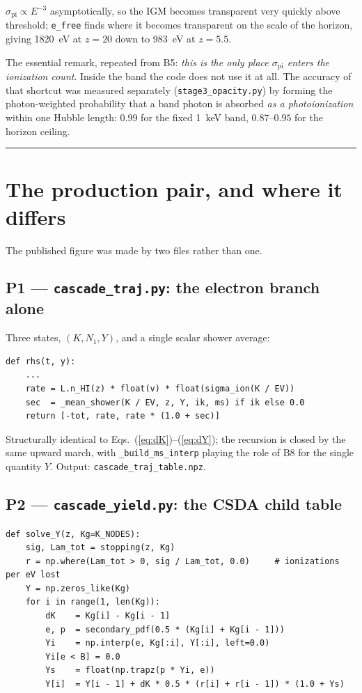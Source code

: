 \documentclass[11pt,a4paper]{article}
\newcommand{\code}[1]{\texttt{\small #1}}
\newcommand{\file}[1]{\texttt{\small #1}}
\newcommand{\spi}{\sigma_{\mathrm{pi}}}
\begin{document}
$\spi \propto E^{-3}$ asymptotically, so the IGM becomes transparent very
quickly above threshold; \code{e\_free} finds where it becomes transparent on
the scale of the horizon, giving 1820~eV at $z=20$ down to 983~eV at $z=5.5$.

The essential remark, repeated from B5: \emph{this is the only place $\spi$
enters the ionization count}.  Inside the band the code does not use it at all.
The accuracy of that shortcut was measured separately (\file{stage3\_opacity.py})
by forming the photon-weighted probability that a band photon is absorbed
\emph{as a photoionization} within one Hubble length:
$0.99$ for the fixed 1~keV band, $0.87$--$0.95$ for the horizon ceiling.

\bigskip
\hrule

\section{The production pair, and where it differs}
\label{sec:prod}

The published figure was made by two files rather than one.

\subsection*{P1 --- \file{cascade\_traj.py}: the electron branch alone}

Three states, $(K, N_1, Y)$, and a single scalar shower average:

\begin{lstlisting}
def rhs(t, y):
    ...
    rate = L.n_HI(z) * float(v) * float(sigma_ion(K / EV))
    sec  = _mean_shower(K / EV, z, Y, ik, ms) if ik else 0.0
    return [-tot, rate, rate * (1.0 + sec)]
\end{lstlisting}

Structurally identical to Eqs.~(\ref{eq:dK})--(\ref{eq:dY}); the recursion is
closed by the same upward march, with \code{\_build\_ms\_interp} playing the
role of B8 for the single quantity $Y$.  Output:
\file{cascade\_traj\_table.npz}.

\subsection*{P2 --- \file{cascade\_yield.py}: the CSDA child table}

\begin{lstlisting}
def solve_Y(z, Kg=K_NODES):
    sig, Lam_tot = stopping(z, Kg)
    r = np.where(Lam_tot > 0, sig / Lam_tot, 0.0)     # ionizations per eV lost
    Y = np.zeros_like(Kg)
    for i in range(1, len(Kg)):
        dK    = Kg[i] - Kg[i - 1]
        e, p  = secondary_pdf(0.5 * (Kg[i] + Kg[i - 1]))
        Yi    = np.interp(e, Kg[:i], Y[:i], left=0.0)
        Yi[e < B] = 0.0
        Ys    = float(np.trapz(p * Yi, e))
        Y[i]  = Y[i - 1] + dK * 0.5 * (r[i] + r[i - 1]) * (1.0 + Ys)
\end{lstlisting}
\end{document}
